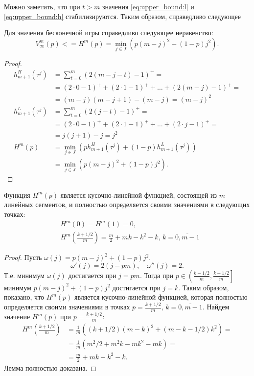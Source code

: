 Можно заметить, что при $ t > m $ значения \eqref{eq:upper_bound:l} и \eqref{eq:upper_bound:h} стабилизируются. Таким образом, справедливо следующее

\begin{prop}
Для значения бесконечной игры справедливо следующее неравенство:
\begin{equation}
\label{eq:upper_bound:value}
V_\infty^m(p) 
<= 
H^m(p) = \min_{j \in J}
    (p(m-j)^2 + (1-p)j^2).
\end{equation}
\end{prop}
\begin{proof}

\begin{align*}
h_{m+1}^H(\tau^j) 
&= \sum_{t=0}^m (2(m-j-t)-1)^+ = \\
&= (2 \cdot 0 - 1)^+ + (2 \cdot 1 - 1)^+ + \ldots + (2(m-j) - 1)^+ = \\
&= (m-j)(m-j+1) - (m-j) = (m-j)^2
\\
h_{m+1}^L(\tau^j)
&= \sum_{t=0}^m (2(j-t)-1)^+ = \\
&= (2 \cdot 0 - 1)^+ + (2 \cdot 1 - 1)^+ + \ldots + (2 \cdot j - 1)^+ = \\
&= j(j+1) - j = j^2
\\
H^m(p) 
&= \min_{j \in J} \left(
    p h_{m+1}^H(\tau^j) + (1-p) h_{m+1}^L(\tau^j)
\right) \\
&= \min_{j \in J} \left(
p (m - j)^2 + (1-p)j^2
\right).
\end{align*}

\end{proof}

\begin{lemma}
\label{lemma:upper_bound:function}
Функция $ H^m(p) $ является кусочно-линейной функцией, состоящей из $ m $ линейных сегментов, и полностью определяется своими значениями в следующих точках:
\begin{eqnarray*}
& H^m(0) = H^m(1) = 0, \\
& H^m\left(\frac{k+1/2}{m}\right) 
    = \frac{m}{2} + mk - k^2 - k, 
        \, k = \overline{0, m - 1}
\end{eqnarray*}
\end{lemma}
\begin{proof}
Пусть $ \omega(j) = p(m-j)^2 + (1-p)j^2 $. 
\[
\omega'(j) = 2(j-pm), \quad
\omega''(j) = 2.
\]
Т.е. минимум $ \omega(j) $ достигается при $ j = pm $. 
Тогда при $ p \in \left( \frac{k - 1/2}{m}, \frac{k+1/2}{m} \right] $ минимум $ p(m-j)^2 + (1-p)j^2 $ достигается при $ j = k $. 
Таким образом, показано, что $ H^m(p) $ является кусочно-линейной функцией, которая полностью определяется своими значениями в точках 
$ p = \frac{k+1/2}{m}, \, k = \overline{0, m-1} $. Найдем значение $ H^m(p) $ при $ p = \frac{k+1/2}{m} $:
\begin{align*}
H^m \left(\frac{k+1/2}{m}\right)
&= \frac{1}{m} \left(
    (k+1/2)(m - k)^2 + (m-k-1/2)k^2
\right) = \\
&= \frac{1}{m} \left(
    m^2/2 + m^2 k - mk^2 - mk
\right) = \\
&= \frac{m}{2} + mk - k^2 - k.
\end{align*}
Лемма полностью доказана.
\end{proof}